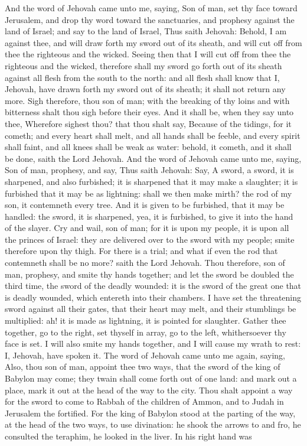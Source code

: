 And the word of Jehovah came unto me, saying, Son of man, set thy face toward Jerusalem, and drop thy word toward the sanctuaries, and prophesy against the land of Israel; and say to the land of Israel, Thus saith Jehovah: Behold, I am against thee, and will draw forth my sword out of its sheath, and will cut off from thee the righteous and the wicked. Seeing then that I will cut off from thee the righteous and the wicked, therefore shall my sword go forth out of its sheath against all flesh from the south to the north: and all flesh shall know that I, Jehovah, have drawn forth my sword out of its sheath; it shall not return any more. Sigh therefore, thou son of man; with the breaking of thy loins and with bitterness shalt thou sigh before their eyes. And it shall be, when they say unto thee, Wherefore sighest thou? that thou shalt say, Because of the tidings, for it cometh; and every heart shall melt, and all hands shall be feeble, and every spirit shall faint, and all knees shall be weak as water: behold, it cometh, and it shall be done, saith the Lord Jehovah.  And the word of Jehovah came unto me, saying, Son of man, prophesy, and say, Thus saith Jehovah: Say, A sword, a sword, it is sharpened, and also furbished; it is sharpened that it may make a slaughter; it is furbished that it may be as lightning: shall we then make mirth? the rod of my son, it contemneth every tree. And it is given to be furbished, that it may be handled: the sword, it is sharpened, yea, it is furbished, to give it into the hand of the slayer. Cry and wail, son of man; for it is upon my people, it is upon all the princes of Israel: they are delivered over to the sword with my people; smite therefore upon thy thigh. For there is a trial; and what if even the rod that contemneth shall be no more? saith the Lord Jehovah. Thou therefore, son of man, prophesy, and smite thy hands together; and let the sword be doubled the third time, the sword of the deadly wounded: it is the sword of the great one that is deadly wounded, which entereth into their chambers. I have set the threatening sword against all their gates, that their heart may melt, and their stumblings be multiplied: ah! it is made as lightning, it is pointed for slaughter. Gather thee together, go to the right, set thyself in array, go to the left, whithersoever thy face is set. I will also smite my hands together, and I will cause my wrath to rest: I, Jehovah, have spoken it.  The word of Jehovah came unto me again, saying, Also, thou son of man, appoint thee two ways, that the sword of the king of Babylon may come; they twain shall come forth out of one land: and mark out a place, mark it out at the head of the way to the city. Thou shalt appoint a way for the sword to come to Rabbah of the children of Ammon, and to Judah in Jerusalem the fortified. For the king of Babylon stood at the parting of the way, at the head of the two ways, to use divination: he shook the arrows to and fro, he consulted the teraphim, he looked in the liver. In his right hand was 